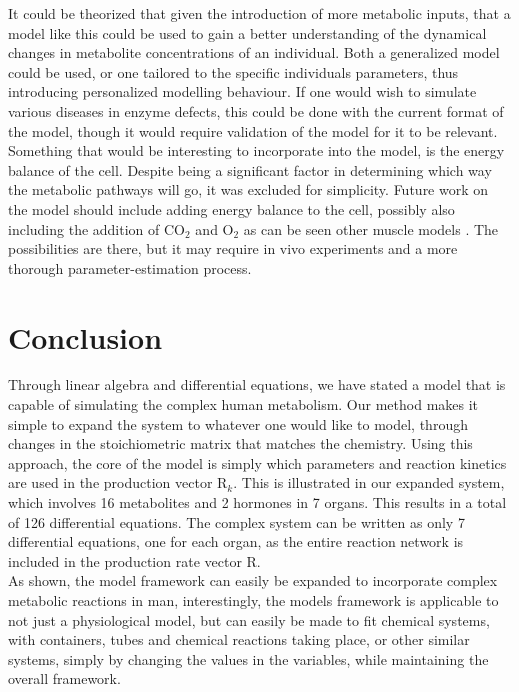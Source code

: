 \documentclass{IEEEtran}
\begin{document}
It could be theorized that given the introduction of more metabolic inputs, that a model like this could be used to gain a better understanding of the dynamical changes in metabolite concentrations of an individual. Both a generalized model could be used, or one tailored to the specific individuals parameters, thus introducing personalized modelling behaviour. If one would wish to simulate various diseases in enzyme defects, this could be done with the current format of the model, though it would require validation of the model for it to be relevant. \\

Something that would be interesting to incorporate into the model, is the energy balance of the cell. Despite being a significant factor in determining which way the metabolic pathways will go, it was excluded for simplicity. Future work on the model should include adding energy balance to the cell, possibly also including the addition of CO$_2$ and O$_2$ as can be seen other muscle models \cite{dash_li_kim_saidel_cabrera_2008}. The possibilities are there, but it may require in vivo experiments and a more thorough parameter-estimation process.

\section{Conclusion}
\label{sec:conclusion}


Through linear algebra and differential equations, we have stated a model that is capable of simulating the complex human metabolism. Our method makes it simple to expand the system to whatever one would like to model, through changes in the stoichiometric matrix that matches the chemistry. Using this approach, the core of the model is simply which parameters and reaction kinetics are used in the production vector R$_k$. This is illustrated in our expanded system, which involves 16 metabolites and 2 hormones in 7 organs. This results in a total of 126 differential equations. The complex system can be written as only 7 differential equations, one for each organ, as the entire reaction network is included in the production rate vector R. \\

As shown, the model framework can easily be expanded to incorporate complex metabolic reactions in man, interestingly, the models framework is applicable to not just a physiological model, but can easily be made to fit chemical systems, with containers, tubes and chemical reactions taking place, or other similar systems, simply by changing the values in the variables, while maintaining the overall framework. \\
\end{document}
